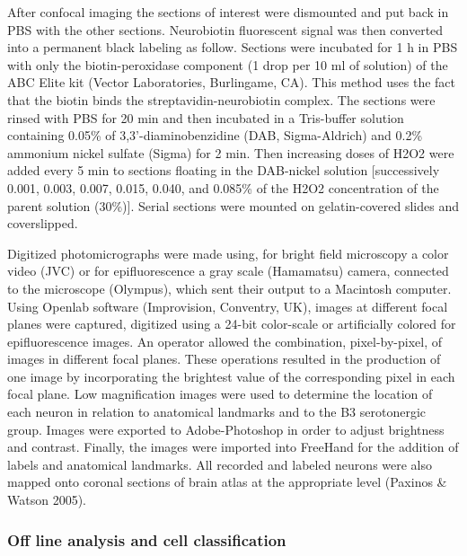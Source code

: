 \documentclass[a4paper,12pt,twoside]{report}
\begin{document}
After confocal imaging the sections of interest were dismounted and put back in PBS with the other sections. Neurobiotin fluorescent signal was then converted into a permanent black labeling as follow. Sections were incubated for 1 h in PBS with only the biotin-peroxidase component (1 drop per 10 ml of solution) of the ABC Elite kit (Vector Laboratories, Burlingame, CA). This method uses the fact that the biotin binds the streptavidin-neurobiotin complex. The sections were rinsed with PBS for 20 min and then incubated in a Tris-buffer solution containing 0.05\% of 3,3’-diaminobenzidine (DAB, Sigma-Aldrich) and 0.2\% ammonium nickel sulfate (Sigma) for 2 min. Then increasing doses of H2O2 were added every 5 min to sections floating in the DAB-nickel solution [successively 0.001, 0.003, 0.007, 0.015, 0.040, and 0.085\% of the H2O2 concentration of the parent solution (30\%)]. Serial sections were mounted on gelatin-covered slides and coverslipped.

Digitized photomicrographs were made using, for bright field microscopy a color video (JVC) or for epifluorescence a gray scale (Hamamatsu) camera, connected to the microscope (Olympus), which sent their output to a Macintosh computer. Using Openlab software (Improvision, Conventry, UK), images at different focal planes were captured, digitized using a 24-bit color-scale or artificially colored for epifluorescence images. An operator allowed the combination, pixel-by-pixel, of images in different focal planes. These operations resulted in the production of one image by incorporating the brightest value of the corresponding pixel in each focal plane. Low magnification images were used to determine the location of each neuron in relation to anatomical landmarks and to the B3 serotonergic group. Images were exported to Adobe-Photoshop in order to adjust brightness and contrast. Finally, the images were imported into FreeHand for the addition of labels and anatomical landmarks. All recorded and labeled neurons were also mapped onto coronal sections of brain atlas at the appropriate level (Paxinos \& Watson 2005).

\subsubsection{Off line analysis and cell classification}
\end{document}

